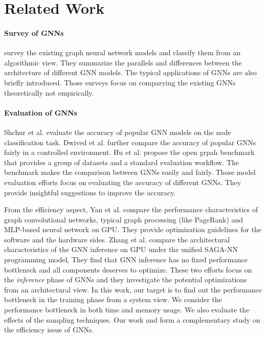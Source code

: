 \section{Related Work}

\paragraph{Survey of GNNs}
\cite{zhou2018_gnn_review,zhang2018_gnn_survey,comprehensive-survey-wu-2020} survey the existing graph neural network models and classify them from an algorithmic view.
They summarize the parallels and differences between the architecture of different GNN models.
The typical applications of GNNs are also briefly introduced.
Those surveys focus on comparying the existing GNNs theoretically not empirically.

\paragraph{Evaluation of GNNs}
Shchur et al. \cite{shchur2018_pitfall_of_gnn} evaluate the accuracy of popular GNN models on the node classification task.
Dwived et al. \cite{dwivedi2020_benchmark_of_gnn} further compare the accuracy of popular GNNs fairly in a controlled environment.
Hu et al. \cite{hu2020_open_graph_benchmark} propose the open grpah benchmark that provides a group of datasets and a standard evaluation workflow.
The benchmark makes the comparison between GNNs easily and fairly.
Those model evaluation efforts focus on evaluating the accuracy of different GNNs.
They provide insightful suggestions to improve the accuracy.

From the efficiency aspect, Yan et al. \cite{yan2020_characterizing_gcn} compare the performance characteristics of graph convolutional networks, typical graph processing (like PageRank) and MLP-based neural network on GPU.
They provide optimization guidelines for the software and the hardware sides.
Zhang et al. \cite{zhang2020_analysis_neugraph} compare the architectural characteristics of the GNN inference on GPU under the unified SAGA-NN \cite{ma2019_neugraph} programming model,
They find that GNN inference has no fixed performance bottleneck and all components deserves to optimize.
These two efforts focus on the \emph{inference} phase of GNNs and they investigate the potential optimizations from an architectural view.
In this work, our target is to find out the performance bottleneck in the training phase from a system view.
We consider the performance bottleneck in both time and memory usage.
We also evaluate the effects of the sampling techniques.
Our work and \cite{yan2020_characterizing_gcn, zhang2020_analysis_neugraph} form a complementary study on the efficiency issue of GNNs.

